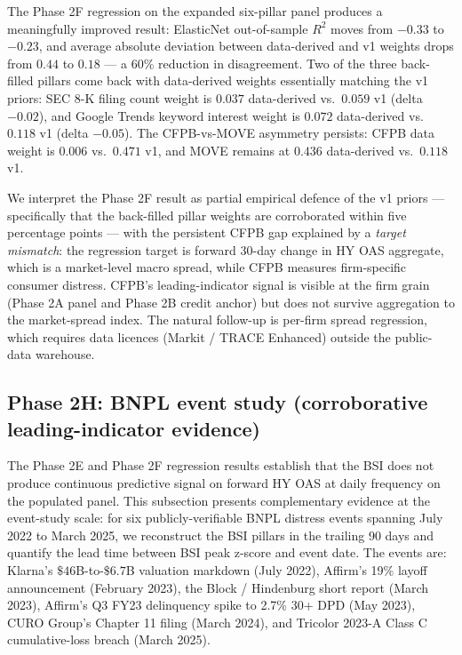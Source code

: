 \documentclass[11pt,a4paper]{article}
\begin{document}
The Phase 2F regression on the expanded six-pillar panel produces a meaningfully improved result: ElasticNet out-of-sample $R^2$ moves from $-0.33$ to $-0.23$, and average absolute deviation between data-derived and v1 weights drops from $0.44$ to $0.18$ --- a 60\% reduction in disagreement. Two of the three back-filled pillars come back with data-derived weights essentially matching the v1 priors: SEC 8-K filing count weight is $0.037$ data-derived vs.\ $0.059$ v1 (delta $-0.02$), and Google Trends keyword interest weight is $0.072$ data-derived vs.\ $0.118$ v1 (delta $-0.05$). The CFPB-vs-MOVE asymmetry persists: CFPB data weight is $0.006$ vs.\ $0.471$ v1, and MOVE remains at $0.436$ data-derived vs.\ $0.118$ v1.

We interpret the Phase 2F result as partial empirical defence of the v1 priors --- specifically that the back-filled pillar weights are corroborated within five percentage points --- with the persistent CFPB gap explained by a \emph{target mismatch}: the regression target is forward 30-day change in HY OAS aggregate, which is a market-level macro spread, while CFPB measures firm-specific consumer distress. CFPB's leading-indicator signal is visible at the firm grain (Phase 2A panel and Phase 2B credit anchor) but does not survive aggregation to the market-spread index. The natural follow-up is per-firm spread regression, which requires data licences (Markit / TRACE Enhanced) outside the public-data warehouse.

\subsection{Phase 2H: BNPL event study (corroborative leading-indicator evidence)}\label{sec:results_event_study}

The Phase 2E and Phase 2F regression results establish that the BSI does not produce continuous predictive signal on forward HY OAS at daily frequency on the populated panel. This subsection presents complementary evidence at the event-study scale: for six publicly-verifiable BNPL distress events spanning July 2022 to March 2025, we reconstruct the BSI pillars in the trailing 90 days and quantify the lead time between BSI peak z-score and event date. The events are: Klarna's $\$46$B-to-$\$6.7$B valuation markdown (July 2022), Affirm's 19\% layoff announcement (February 2023), the Block / Hindenburg short report (March 2023), Affirm's Q3 FY23 delinquency spike to 2.7\% 30+ DPD (May 2023), CURO Group's Chapter 11 filing (March 2024), and Tricolor 2023-A Class C cumulative-loss breach (March 2025).
\end{document}
